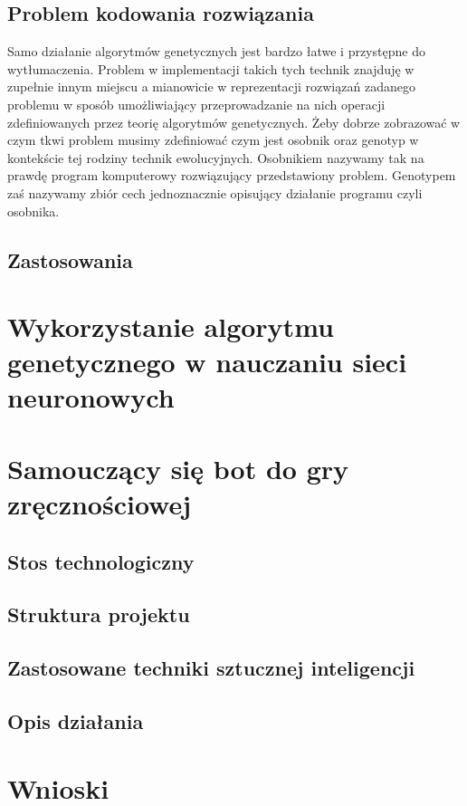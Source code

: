\documentclass[12pt, oneside, a4paper]{report}
\begin{document}
\section{Problem kodowania rozwiązania}

Samo działanie algorytmów genetycznych jest bardzo łatwe i przystępne do wytłumaczenia. Problem w implementacji takich tych technik znajduję w zupełnie innym miejscu a mianowicie w reprezentacji rozwiązań zadanego problemu w sposób umożliwiający przeprowadzanie na nich operacji zdefiniowanych przez teorię algorytmów genetycznych. Żeby dobrze zobrazować w czym tkwi problem musimy zdefiniować czym jest osobnik oraz genotyp w kontekście tej rodziny technik ewolucyjnych. Osobnikiem nazywamy tak na prawdę program komputerowy rozwiązujący przedstawiony problem. Genotypem zaś nazywamy zbiór cech jednoznacznie opisujący działanie programu czyli osobnika. 

\section{Zastosowania}


\chapter{Wykorzystanie algorytmu genetycznego w nauczaniu sieci neuronowych}


\chapter{Samouczący się bot do gry zręcznościowej}
\section{Stos technologiczny}
\section{Struktura projektu}
\section{Zastosowane techniki sztucznej inteligencji}\textsl{}
\section{Opis działania}


\chapter{Wnioski}

\pagebreak


\end{document}
